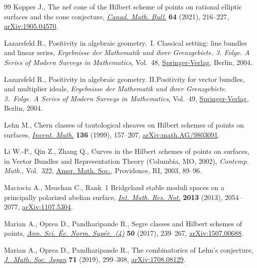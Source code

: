 \begin{thebibliography}{99}
Kopper J., The nef cone of the {H}ilbert scheme of points on rational elliptic
 surfaces and the cone conjecture, \href{https://doi.org/10.4153/S0008439520000387}{\textit{Canad. Math. Bull.}} \textbf{64}
 (2021), 216--227, \href{https://arxiv.org/abs/1905.04570}{arXiv:1905.04570}.

Lazarsfeld R., Positivity in algebraic geometry.~{I}. Classical setting: line
 bundles and linear series, \textit{Ergebnisse der Mathematik und ihrer
 Grenzgebiete. 3. Folge. A Series of Modern Surveys in Mathematics}, Vol.~48,
 \href{https://doi.org/10.1007/978-3-642-18808-4}{Springer-Verlag}, Berlin, 2004.

Lazarsfeld R., Positivity in algebraic geometry. {II}.Positivity for vector
 bundles, and multiplier ideals, \textit{Ergebnisse der Mathematik und ihrer
 Grenzgebiete. 3.~Folge. A Series of Modern Surveys in Mathematics}, Vol.~49,
 \href{https://doi.org/10.1007/978-3-642-18810-7}{Springer-Verlag}, Berlin, 2004.

Lehn M., Chern classes of tautological sheaves on {H}ilbert schemes of points
 on surfaces, \href{https://doi.org/10.1007/s002220050307}{\textit{Invent. Math.}} \textbf{136} (1999), 157--207,
 \href{https://arxiv.org/abs/math.AG/9803091}{arXiv:math.AG/9803091}.

Li W.-P., Qin Z., Zhang Q., Curves in the {H}ilbert schemes of points on
 surfaces, in Vector Bundles and Representation Theory ({C}olumbia, {MO},
 2002), \textit{Contemp. Math.}, Vol.~322, \href{https://doi.org/10.1090/conm/322/05681}{Amer. Math. Soc.}, Providence, RI,
 2003, 89--96.

Maciocia A., Meachan C., Rank~1 {B}ridgeland stable moduli spaces on a
 principally polarized abelian surface, \href{https://doi.org/10.1093/imrn/rns107}{\textit{Int. Math. Res. Not.}}
 \textbf{2013} (2013), 2054--2077, \href{https://arxiv.org/abs/1107.5304}{arXiv:1107.5304}.

Marian A., Oprea D., Pandharipande R., Segre classes and {H}ilbert schemes of
 points, \href{https://doi.org/10.24033/asens.2320}{\textit{Ann. Sci. \'Ec. Norm. Sup\'er.~(4)}} \textbf{50} (2017),
 239--267, \href{https://arxiv.org/abs/1507.00688}{arXiv:1507.00688}.

Marian A., Oprea D., Pandharipande R., The combinatorics of {L}ehn's
 conjecture, \href{https://doi.org/10.2969/jmsj/78747874}{\textit{J.~Math. Soc. Japan}} \textbf{71} (2019), 299--308,
 \href{https://arxiv.org/abs/1708.08129}{arXiv:1708.08129}.


\end{thebibliography}
